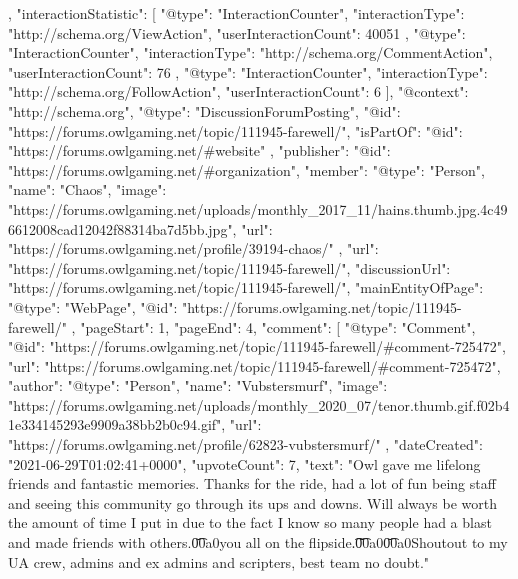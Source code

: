{{    },
    "interactionStatistic": [
        {
            "@type": "InteractionCounter",
            "interactionType": "http://schema.org/ViewAction",
            "userInteractionCount": 40051
        },
        {
            "@type": "InteractionCounter",
            "interactionType": "http://schema.org/CommentAction",
            "userInteractionCount": 76
        },
        {
            "@type": "InteractionCounter",
            "interactionType": "http://schema.org/FollowAction",
            "userInteractionCount": 6
        }
    ],
    "@context": "http://schema.org",
    "@type": "DiscussionForumPosting",
    "@id": "https://forums.owlgaming.net/topic/111945-farewell/",
    "isPartOf": {
        "@id": "https://forums.owlgaming.net/#website"
    },
    "publisher": {
        "@id": "https://forums.owlgaming.net/#organization",
        "member": {
            "@type": "Person",
            "name": "Chaos",
            "image": "https://forums.owlgaming.net/uploads/monthly_2017_11/hains.thumb.jpg.4c496612008cad12042f88314ba7d5bb.jpg",
            "url": "https://forums.owlgaming.net/profile/39194-chaos/"
        }
    },
    "url": "https://forums.owlgaming.net/topic/111945-farewell/",
    "discussionUrl": "https://forums.owlgaming.net/topic/111945-farewell/",
    "mainEntityOfPage": {
        "@type": "WebPage",
        "@id": "https://forums.owlgaming.net/topic/111945-farewell/"
    },
    "pageStart": 1,
    "pageEnd": 4,
    "comment": [
        {
            "@type": "Comment",
            "@id": "https://forums.owlgaming.net/topic/111945-farewell/#comment-725472",
            "url": "https://forums.owlgaming.net/topic/111945-farewell/#comment-725472",
            "author": {
                "@type": "Person",
                "name": "Vubstersmurf",
                "image": "https://forums.owlgaming.net/uploads/monthly_2020_07/tenor.thumb.gif.f02b41e334145293e9909a38bb2b0c94.gif",
                "url": "https://forums.owlgaming.net/profile/62823-vubstersmurf/"
            },
            "dateCreated": "2021-06-29T01:02:41+0000",
            "upvoteCount": 7,
            "text": "Owl gave me lifelong friends and fantastic memories. Thanks for the ride, had a lot of fun being staff and seeing this community go through its ups and downs. Will always be worth the amount of time I put in due to the fact I know so many people had a blast and made friends with others.\n \n\n\n\t\u00a0\n \n\n\n\tCatch you all on the flipside.\n \n\n\n\t \n\n\n\t\u00a0\n \n\n\n\t\u00a0\n \n\n\n\tps Shoutout to my UA crew, admins and ex admins and scripters, best team no doubt.\n \n"
}}
